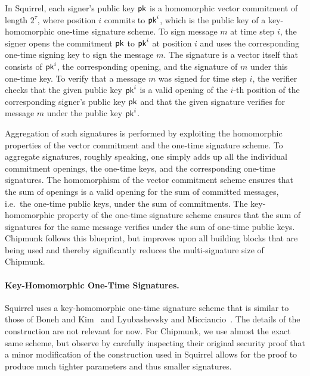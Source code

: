In Squirrel, each signer's public key $\mathsf{pk}$ is a homomorphic vector commitment of length $2^\tau$, where position $i$ commits to $\mathsf{pk}^i$, which is the public key of a key-homomorphic one-time signature scheme.
To sign message $m$ at time step $i$, the signer opens the commitment $\mathsf{pk}$ to $\mathsf{pk}^i$ at position $i$ and uses the corresponding one-time signing key to sign the message $m$.
The signature is a vector itself that consists of $\mathsf{pk}^i$, the corresponding opening, and the signature of $m$ under this one-time key.
To verify that a message $m$ was signed for time step $i$, the verifier checks that the given public key $\mathsf{pk}^i$ is a valid opening of the $i$-th position of the corresponding signer's public key $\mathsf{pk}$ and that the given signature verifies for message $m$ under the public key $\mathsf{pk}^i$.

Aggregation of such signatures is performed by exploiting the homomorphic properties of the vector commitment and the one-time signature scheme.
To aggregate signatures, roughly speaking, one simply adds up all the individual commitment openings, the one-time keys, and the corresponding one-time signatures.
The homomorphism of the vector commitment scheme ensures that the sum of openings is a valid opening for the sum of committed messages, i.e.\ the one-time public keys, under the sum of commitments.
The key-homomorphic property of the one-time signature scheme ensures that the sum of signatures for the same message verifies under the sum of one-time public keys.
Chipmunk follows this blueprint, but improves upon all building blocks that are being used and thereby significantly reduces the multi-signature size of Chipmunk.

\paragraph{Key-Homomorphic One-Time Signatures.}
Squirrel uses a key-homomorphic one-time signature scheme that is similar to those of Boneh and Kim~\cite{BonKim2020} and Lyubashevsky and Micciancio~\cite{TCC:LyuMic08}.
The details of the construction are not relevant for now.
For Chipmunk, we use almost the exact same scheme, but observe by carefully inspecting their original security proof that a minor modification of the construction used in Squirrel allows for the proof to produce much tighter parameters and thus smaller signatures.

